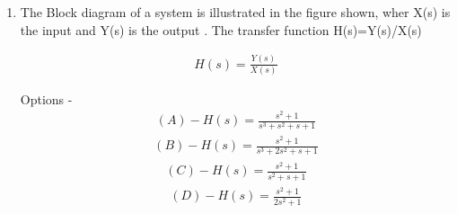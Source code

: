 


%



\begin{enumerate}[label=\thesection.\arabic*.,ref=\thesection.\theenumi]
\item The Block diagram of a system is illustrated in the figure shown, wher X(s) is the input and Y(s) is the output . The transfer function H(s)=Y(s)/X(s)

\begin{align}
 H(s)=\frac{Y(s)}{X(s)} 
\end{align}




Options -
\begin{align}
 (A) - H(s)=\frac{s^2+1}{s^3+s^2+s+1}
 \end{align}
 \begin{align}
 (B) - H(s)=\frac{s^2+1}{s^3+2s^2+s+1}
 \end{align}
 \begin{align}
 (C) - H(s)=\frac{s^2+1}{s^2+s+1}
 \end{align}
 \begin{align}
 (D) - H(s)=\frac{s^2+1}{2s^2+1}
\end{align}



\end{enumerate}
